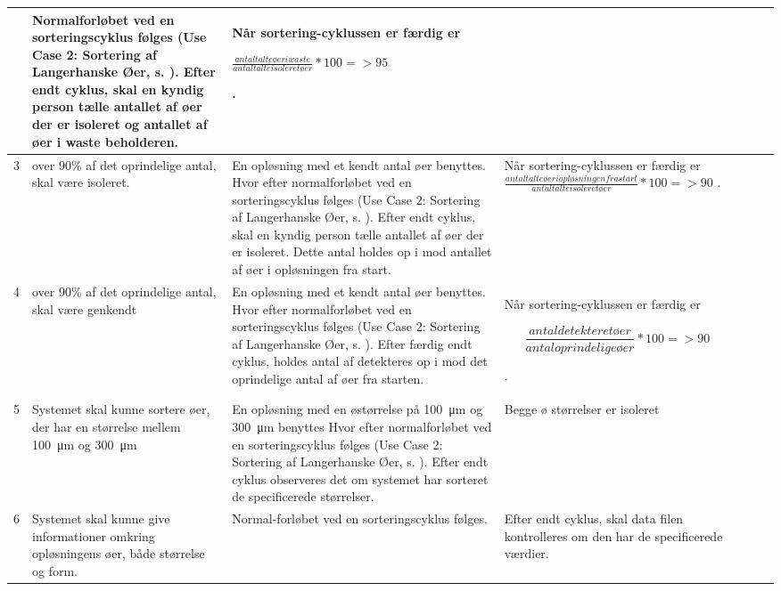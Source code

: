 \begin{center}
\begin{longtable}{ | m{1.785cm} | m{1.785cm}| m{1.785cm}| m{1.785cm}| m{1.785cm}| m{1.785cm}|m{1.785cm}| }
 & Normalforløbet ved en sorteringscyklus følges (Use Case 2: Sortering af Langerhanske Øer, s.  \pageref{uc:2}). Efter endt cyklus, skal en kyndig person tælle antallet af øer der er isoleret og antallet af øer i waste beholderen.  & Når sortering-cyklussen er færdig er

 $\frac{antal talte øer i waste}{antal talte isoleret øer}*100= >95$

.   &  & & \\
			\hline		
			
			3 &  over 90\% af det oprindelige antal, skal være isoleret.

   & En opløsning med et kendt antal øer benyttes. Hvor efter normalforløbet ved en sorteringscyklus følges (Use Case 2: Sortering af Langerhanske Øer, s. \pageref{uc:2}). Efter endt cyklus, skal en kyndig person tælle antallet af øer der er isoleret. Dette antal holdes op i mod antallet af øer i opløsningen fra start. & Når sortering-cyklussen er færdig er
 $\frac{antal talte øer i opløsningen fra start}{antal talte isoleret øer}*100= >90$
.   &  & & \\
			\hline		
			
4 &  over 90\% af det oprindelige antal, skal være genkendt
   & En opløsning med et kendt antal øer benyttes. Hvor efter normalforløbet ved en sorteringscyklus følges (Use Case 2: Sortering af Langerhanske Øer, s. \pageref{uc:2}). Efter færdig endt cyklus, holdes antal af detekteres op i mod det oprindelige antal af øer fra starten.
    & Når sortering-cyklussen er færdig er

 $$\frac{antal detekteret øer}{antal oprindelige øer} * 100 = >90$$

.   &  & & \\
			\hline		
			
			5 &  Systemet skal kunne sortere øer, der har en størrelse mellem  \SI{100}{\micro\metre}  og  \SI{300}{\micro\metre} 
   & En opløsning med en østørrelse på \SI{100}{\micro\metre}  og \SI{300}{\micro\metre} benyttes  Hvor efter normalforløbet ved en sorteringscyklus følges (Use Case 2: Sortering af Langerhanske Øer, s. \pageref{uc:2}). Efter endt cyklus observeres det om systemet har sorteret de specificerede størrelser.
    & Begge ø størrelser er isoleret
    &  & & \\
			\hline			
			
			6 &  Systemet skal kunne give informationer omkring opløsningens øer, både størrelse og form. 
   & Normal-forløbet ved en sorteringscyklus følges. 
    & Efter endt cyklus, skal data filen kontrolleres om den har de specificerede værdier.
    &  & & \\
			\hline	
			
		\end{longtable}
		
	\end{center}
	\pagebreak